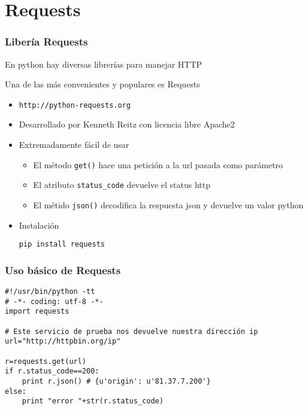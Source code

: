 \documentclass[ucs]{beamer}
\begin{document}
\section{Requests}
\begin{frame}[fragile]
\frametitle{Libería Requests}
En python hay diversas librerías para manejar HTTP

Una de las más convenientes y populares es Requests
\begin{itemize}
\item
  \begin{footnotesize}
  \begin{verbatim}
http://python-requests.org
  \end{verbatim}
  \end{footnotesize}
\item
Desarrollado por Kenneth Reitz con licencia libre Apache2
\item
Extremadamente fácil de usar

\begin{itemize}
\item
El método \verb|get()| hace una petición a la url pasada como parámetro
\item
El atributo \verb|status_code| devuelve el status http
\item
El métido \verb|json()| decodifica la respuesta json y devuelve un valor python
\end{itemize}
\item
Instalación

  \begin{footnotesize}
  \begin{verbatim}
pip install requests
  \end{verbatim}
  \end{footnotesize}
\end{itemize}

\end{frame}


\begin{frame}[fragile]
\frametitle{Uso básico de Requests}


  \begin{footnotesize}
  \begin{verbatim}
#!/usr/bin/python -tt
# -*- coding: utf-8 -*-
import requests

# Este servicio de prueba nos devuelve nuestra dirección ip
url="http://httpbin.org/ip"

r=requests.get(url)
if r.status_code==200:
    print r.json() # {u'origin': u'81.37.7.200'}
else:
    print "error "+str(r.status_code)
  \end{verbatim}
  \end{footnotesize}

\end{frame}
\end{document}
